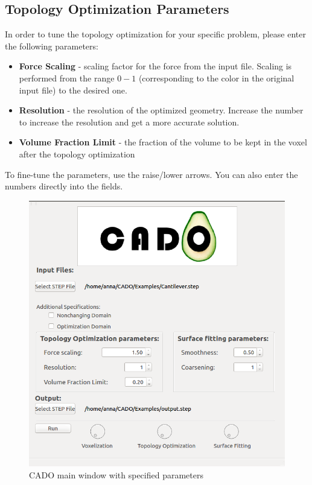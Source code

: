 \documentclass[
12pt, %
a4paper, %
oneside, %
headinclude,footinclude, %
BCOR5mm, %
]{scrartcl}
\begin{document}
\subsection{Topology Optimization Parameters}
In order to tune the topology optimization for your specific problem, please enter the following parameters:
\begin{itemize}
\item \textbf{Force Scaling} - scaling factor for the force from the input file. Scaling is performed from the range $0 - 1$ (corresponding to the color in the original input file) to the desired one.
\item \textbf{Resolution} - the resolution of the optimized geometry. Increase the number to increase the resolution and get a more accurate solution.
\item \textbf{Volume Fraction Limit} - the fraction of the volume to be kept in the voxel after the topology optimization
\end{itemize}

To fine-tune the parameters, use the raise/lower arrows. You can also enter the numbers directly into the fields.

\begin{figure}
\centering
\includegraphics[scale=0.4]{Pictures/CADO_mainWindowParameters.png}
\caption{CADO main window with specified parameters}
\label{fig:mainWindowParameters}
\end{figure}
\end{document}
